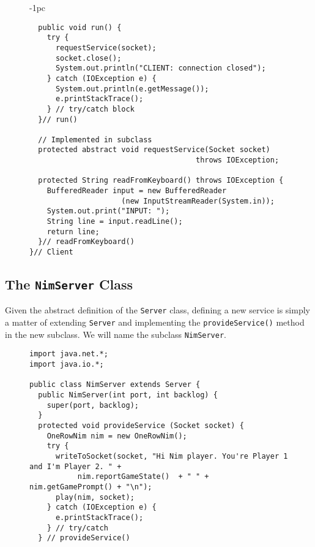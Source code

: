 {\begin{figure}[htb]
\begin{jjjlistingleft}[27pc]{-1pc}
\begin{lstlisting}
  public void run() {
    try {
      requestService(socket);
      socket.close();
      System.out.println("CLIENT: connection closed");
    } catch (IOException e) {
      System.out.println(e.getMessage());
      e.printStackTrace();
    } // try/catch block
  }// run()

  // Implemented in subclass
  protected abstract void requestService(Socket socket) 
                                      throws IOException;

  protected String readFromKeyboard() throws IOException {
    BufferedReader input = new BufferedReader 
                     (new InputStreamReader(System.in));
    System.out.print("INPUT: ");
    String line = input.readLine();
    return line;
  }// readFromKeyboard()
}// Client
\end{lstlisting}
\end{jjjlistingleft}
\end{figure}

\subsection{The {\tt NimServer} Class}

Given the abstract definition of the {\tt Server} class, defining a
new service is simply a matter of extending {\tt Server} and
 implementing the {\tt provideService()}
method in the new subclass. We will name the subclass {\tt NimServer}.

\clearpage
\begin{figure}[h!]
\jjjprogstart
\begin{jjjlisting}[29pc]
\begin{lstlisting}[basicstyle=\scriptsize]
import java.net.*;
import java.io.*;

public class NimServer extends Server {
  public NimServer(int port, int backlog) {
    super(port, backlog);
  }
  protected void provideService (Socket socket) {
    OneRowNim nim = new OneRowNim();
    try {
      writeToSocket(socket, "Hi Nim player. You're Player 1 and I'm Player 2. " +
           nim.reportGameState()  + " " + nim.getGamePrompt() + "\n");
      play(nim, socket);
    } catch (IOException e) {
      e.printStackTrace();
    } // try/catch
  } // provideService()


\end{lstlisting}
\end{jjjlisting}
\end{figure}}

